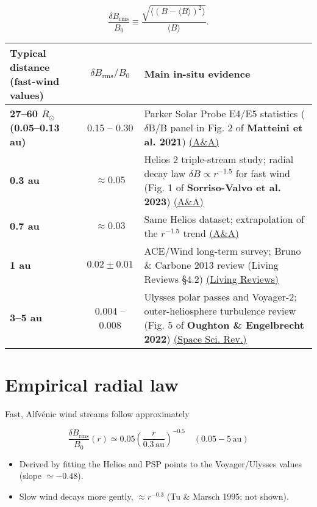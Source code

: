 \[
\frac{\delta B_{\mathrm{rms}}}{B_0}
     \equiv
     \frac{\sqrt{\langle (B-\langle B\rangle)^2\rangle}}{\langle B\rangle}.
\]

\begin{tabular}{|l|c|l|}
\hline
\textbf{Typical distance (fast-wind values)} & $\delta B_{\mathrm{rms}}/B_0$ & \textbf{Main in-situ evidence} \\
\hline
\textbf{27--60 $R_\odot$ (0.05--0.13 au)} & 0.15 -- 0.30 & Parker Solar Probe E4/E5 statistics ($\delta$B/B panel in Fig. 2 of \textbf{Matteini et al. 2021}) \href{https://www.aanda.org/articles/aa/full_html/2021/06/aa39872-20/aa39872-20.html}{(A\&A)} \\
\hline
\textbf{0.3 au} & $\approx 0.05$ & Helios 2 triple-stream study; radial decay law $\delta B \propto r^{-1.5}$ for fast wind (Fig. 1 of \textbf{Sorriso-Valvo et al. 2023}) \href{https://www.aanda.org/articles/aa/full_html/2023/04/aa44889-22/aa44889-22.html}{(A\&A)} \\
\hline
\textbf{0.7 au} & $\approx 0.03$ & Same Helios dataset; extrapolation of the $r^{-1.5}$ trend \href{https://www.aanda.org/articles/aa/full_html/2023/04/aa44889-22/aa44889-22.html}{(A\&A)} \\
\hline
\textbf{1 au} & $0.02 \pm 0.01$ & ACE/Wind long-term survey; Bruno \& Carbone 2013 review (Living Reviews \S 4.2) \href{https://link.springer.com/article/10.12942/lrsp-2013-2}{(Living Reviews)} \\
\hline
\textbf{3--5 au} & 0.004 -- 0.008 & Ulysses polar passes and Voyager-2; outer-heliosphere turbulence review (Fig. 5 of \textbf{Oughton \& Engelbrecht 2022}) \href{https://link.springer.com/article/10.1007/s11214-022-00914-2}{(Space Sci. Rev.)} \\
\hline
\end{tabular}

\section*{Empirical radial law}

Fast, Alfvénic wind streams follow approximately

\[
\boxed{
\frac{\delta B_{\mathrm{rms}}}{B_0}(r) \simeq 0.05
\left( \frac{r}{0.3\,\mathrm{au}} \right)^{-0.5}
\quad (0.05\!-\!5\,\mathrm{au})
}
\]

\begin{itemize}
\item Derived by fitting the Helios and PSP points to the Voyager/Ulysses values (slope $\simeq -0.48$).
\item Slow wind decays more gently, $\approx r^{-0.3}$ (Tu \& Marsch 1995; not shown).
\end{itemize}

